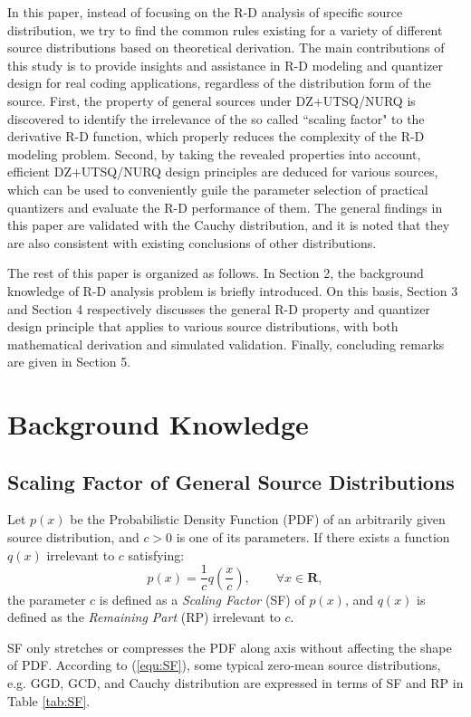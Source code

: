 \documentclass[smallabstract,smallcaptions]{dccpaper}
\begin{document}
In this paper, instead of focusing on the R-D analysis of specific source distribution, we try to find the common rules existing for a variety of different source distributions based on theoretical derivation. The main contributions of this study is to provide insights and assistance in R-D modeling and quantizer design for real coding applications, regardless of the distribution form of the source. First, the property of general sources under DZ+UTSQ/NURQ is discovered to identify the irrelevance of the so called ``scaling factor" to the derivative R-D function, which properly reduces the complexity of the R-D modeling problem. Second, by taking the revealed properties into account, efficient DZ+UTSQ/NURQ design principles are deduced for various sources, which can be used to conveniently guile the parameter selection of practical quantizers and evaluate the R-D performance of them. The general findings in this paper are validated with the Cauchy distribution, and it is noted that they are also consistent with existing conclusions of other distributions.

The rest of this paper is organized as follows. In Section 2, the background knowledge of R-D analysis problem is briefly introduced. On this basis, Section 3 and Section 4 respectively discusses the general R-D property and quantizer design principle that applies to various source distributions, with both mathematical derivation and simulated validation. Finally, concluding remarks are given in Section 5.

\section{Background Knowledge}

\subsection{Scaling Factor of General Source Distributions}
Let $p(x)$ be the Probabilistic Density Function (PDF) of an arbitrarily given source distribution, and $c>0$ is one of its parameters. If there exists a function $q(x)$ irrelevant to $c$ satisfying:
\begin{equation}
\label{equ:SF}
p(x)=\frac{1}{c} q(\frac{x}{c}),\qquad \forall x \in \mathbf{R},
\end{equation}
the parameter $c$ is defined as a \emph{Scaling Factor} (SF) of $p(x)$, and $q(x)$ is defined as the \emph{Remaining Part} (RP) irrelevant to $c$.

SF only stretches or compresses the PDF along axis without affecting the shape of PDF. According to (\ref{equ:SF}), some typical zero-mean source distributions, e.g. GGD, GCD, and Cauchy distribution are expressed in terms of SF and RP in Table \ref{tab:SF}. %
\end{document}

